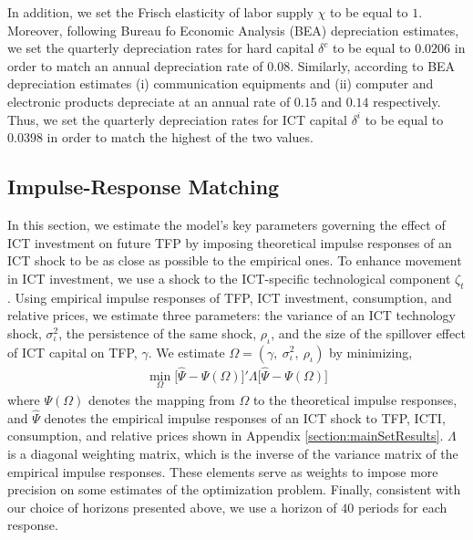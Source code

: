 \documentclass[12pt]{article}
\begin{document}
In addition, we set the Frisch elasticity of labor supply $\chi$ to be equal to $1$. Moreover, following Bureau fo Economic Analysis (BEA) depreciation estimates, we set the quarterly depreciation rates for hard capital $\delta^c$ to be equal to $0.0206$ in order to match an annual depreciation rate of $0.08$. Similarly, according to BEA depreciation estimates (i) communication equipments and (ii) computer and electronic products depreciate at an annual rate of $0.15$ and $0.14$ respectively. Thus, we set the quarterly depreciation rates for ICT capital $\delta^i$ to be equal to $0.0398$ in order to match the highest of the two values.




\subsection{Impulse-Response Matching}\label{section:IRmatching}

In this section, we estimate the model's key parameters governing the effect of ICT investment on future TFP by imposing theoretical impulse responses of an ICT shock to be as close as possible to the empirical ones. To enhance movement in ICT investment, we use a shock to the ICT-specific technological component $\zeta_t$. Using empirical impulse responses of TFP, ICT investment, consumption, and relative prices, we estimate three parameters: the variance of an ICT technology shock, $\sigma_{\iota}^2$, the persistence of the same shock, $\rho_{\iota}$, and the size of the spillover effect of ICT capital on TFP, $\gamma$. We estimate $\Omega = (\gamma, \ \sigma_{\iota}^2, \ \rho_{\iota})$ by minimizing,
\begin{eqnarray}\label{equation:min_prob_IRmatching}
\min_{\Omega} \big[  \hat{\Psi} - \Psi(\Omega)  \big]' \Lambda \big[  \hat{\Psi} - \Psi(\Omega)  \big]
\end{eqnarray}
where $\Psi(\Omega)$ denotes the mapping from $\Omega$ to the theoretical impulse responses, and $\hat{\Psi}$ denotes the empirical impulse responses of an ICT shock to TFP, ICTI, consumption, and relative prices shown in Appendix \ref{section:mainSetResults}. $\Lambda$ is a diagonal weighting matrix, which is the inverse of the variance matrix of the empirical impulse responses. These elements serve as weights to impose more precision on some estimates of the optimization problem. Finally, consistent with our choice of horizons presented above, we use a horizon of $40$ periods for each response. %
\end{document}
